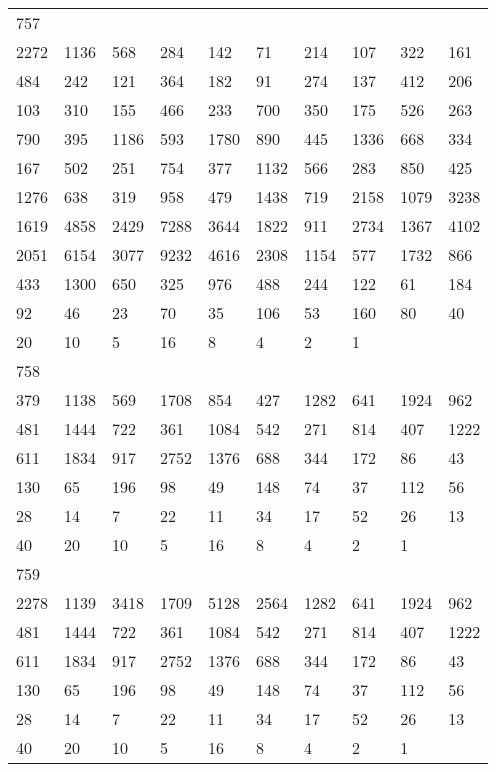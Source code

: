 \begin{longtable}{*{10}{l}}
757&&&&&&&&&\\
2272& 1136& 568& 284& 142& 71& 214& 107& 322& 161\\
484& 242& 121& 364& 182& 91& 274& 137& 412& 206\\
103& 310& 155& 466& 233& 700& 350& 175& 526& 263\\
790& 395& 1186& 593& 1780& 890& 445& 1336& 668& 334\\
167& 502& 251& 754& 377& 1132& 566& 283& 850& 425\\
1276& 638& 319& 958& 479& 1438& 719& 2158& 1079& 3238\\
1619& 4858& 2429& 7288& 3644& 1822& 911& 2734& 1367& 4102\\
2051& 6154& 3077& 9232& 4616& 2308& 1154& 577& 1732& 866\\
433& 1300& 650& 325& 976& 488& 244& 122& 61& 184\\
92& 46& 23& 70& 35& 106& 53& 160& 80& 40\\
20& 10& 5& 16& 8& 4& 2& 1& \\

758&&&&&&&&&\\
379& 1138& 569& 1708& 854& 427& 1282& 641& 1924& 962\\
481& 1444& 722& 361& 1084& 542& 271& 814& 407& 1222\\
611& 1834& 917& 2752& 1376& 688& 344& 172& 86& 43\\
130& 65& 196& 98& 49& 148& 74& 37& 112& 56\\
28& 14& 7& 22& 11& 34& 17& 52& 26& 13\\
40& 20& 10& 5& 16& 8& 4& 2& 1& \\

759&&&&&&&&&\\
2278& 1139& 3418& 1709& 5128& 2564& 1282& 641& 1924& 962\\
481& 1444& 722& 361& 1084& 542& 271& 814& 407& 1222\\
611& 1834& 917& 2752& 1376& 688& 344& 172& 86& 43\\
130& 65& 196& 98& 49& 148& 74& 37& 112& 56\\
28& 14& 7& 22& 11& 34& 17& 52& 26& 13\\
40& 20& 10& 5& 16& 8& 4& 2& 1& \\


\end{longtable}
